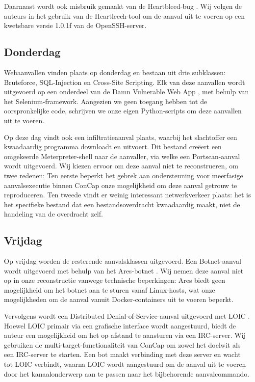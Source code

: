 \documentclass[conference]{IEEEtran}
\begin{document}
	Daarnaast wordt ook misbruik gemaakt van de Heartbleed-bug \cite{heartbleed}. Wij volgen de auteurs in het gebruik van de Heartleech-tool \cite{heartleech} om de aanval uit te voeren op een kwetsbare versie 1.0.1f van de OpenSSH-server. 
	
	\subsection{Donderdag}
	Webaanvallen vinden plaats op donderdag en bestaan uit drie subklassen: Bruteforce, SQL-Injection en Cross-Site Scripting. Elk van deze aanvallen wordt uitgevoerd op een onderdeel van de Damn Vulnerable Web App \cite{dvwa}, met behulp van het Selenium-framework. Aangezien we geen toegang hebben tot de oorspronkelijke code, schrijven we onze eigen Python-scripts om deze aanvallen uit te voeren.
	
	Op deze dag vindt ook een infiltratieaanval plaats, waarbij het slachtoffer een kwaadaardig programma downloadt en uitvoert. Dit bestand creëert een omgekeerde Meterpreter-shell naar de aanvaller, via welke een Portscan-aanval wordt uitgevoerd. Wij kiezen ervoor om deze aanval niet te reconstrueren, om twee redenen: Ten eerste beperkt het gebrek aan ondersteuning voor meerfasige aanvalsexecutie binnen ConCap onze mogelijkheid om deze aanval getrouw te reproduceren. Ten tweede vindt er weinig interessant netwerkverkeer plaats: het is het specifieke bestand dat een bestandsoverdracht kwaadaardig maakt, niet de handeling van de overdracht zelf.
	
	\subsection{Vrijdag}
	Op vrijdag worden de resterende aanvalsklassen uitgevoerd.
	Een Botnet-aanval wordt uitgevoerd met behulp van het Ares-botnet \cite{ares}. Wij nemen deze aanval niet op in onze reconstructie vanwege technische beperkingen: Ares biedt geen mogelijkheid om het botnet aan te sturen vanaf Linux-hosts, wat onze mogelijkheden om de aanval vanuit Docker-containers uit te voeren beperkt.
	
	Vervolgens wordt een Distributed Denial-of-Service-aanval uitgevoerd met LOIC \cite{loic}. Hoewel LOIC primair via een grafische interface wordt aangestuurd, biedt de auteur een mogelijkheid om het op afstand te aansturen via een IRC-server. Wij gebruiken de multi-target-functionaliteit van ConCap om zowel het doelwit als een IRC-server te starten. Een bot maakt verbinding met deze server en wacht tot LOIC verbindt, waarna LOIC wordt aangestuurd om de aanval uit te voeren door het kanaalonderwerp aan te passen naar het bijbehorende aanvalcommando.
	
\end{document}
